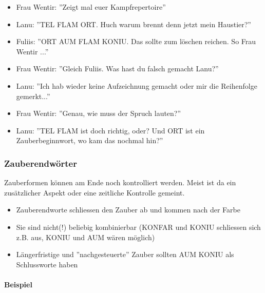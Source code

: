 \documentclass{article}
\begin{document}
\begin{itemize}
\item Frau Wentir: ''Zeigt mal euer Kampfrepertoire''
\item Lanu: ''TEL FLAM ORT. Huch warum brennt denn jetzt mein Haustier?''
\item Fuliis: ''ORT AUM FLAM KONIU. Das sollte zum löschen reichen. So Frau Wentir ...''
\item Frau Wentir: ''Gleich Fuliis. Was hast du falsch gemacht Lanu?''
\item Lanu: ''Ich hab wieder keine Aufzeichnung gemacht oder mir die Reihenfolge gemerkt...''
\item Frau Wentir: ''Genau, wie muss der Spruch lauten?''
\item Lanu: ''TEL FLAM ist doch richtig, oder? Und ORT ist ein Zauberbeginnwort, wo kam das nochmal hin?''
\end{itemize}

\subsubsection{Zauberendwörter}

Zauberformen können am Ende noch kontrolliert werden. Meist ist da ein zusätzlicher Aspekt oder eine zeitliche
Kontrolle gemeint.

\begin{itemize}
\item Zauberendworte schliessen den Zauber ab und kommen nach der Farbe
\item Sie sind nicht(!) beliebig kombinierbar (KONFAR und KONIU schliessen sich z.B. aus, KONIU und AUM wären möglich)
\item Längerfristige und ''nachgesteuerte'' Zauber sollten AUM KONIU als Schlussworte haben
\end{itemize}

\paragraph{Beispiel}
\end{document}
